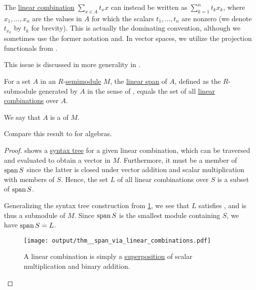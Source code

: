 \begin{remark}\label{rem:linear_combinations}
  The \hyperref[def:free_semimodule]{linear combination} \( \sum_{x \in A} t_x x \) can instead be written as \( \sum_{k=1}^n t_k x_k \), where \( x_1, \ldots, x_n \) are the values in \( A \) for which the scalars \( t_1, \ldots, t_n \) are nonzero (we denote \( t_{x_k} \) by \( t_k \) for brevity). This is actually the dominating convention, although we sometimes use the former notation and. In vector spaces, we utilize the projection functionals from .

  This issue is discussed in more generality in .
\end{remark}

\begin{proposition}\label{thm:span_via_linear_combinations}
  For a set \( A \) in an \( R \)-\hyperref[def:semimodule]{semimodule} \( M \), the \hyperref[def:semimodule/submodel]{linear span} of \( A \), defined as the \( R \)-submodule generated by \( A \) in the sense of , equals the set of all \hyperref[rem:linear_combinations]{linear combinations} over \( A \).

  We say that \( A \) is a  of \( M \).

  Compare this result to  for algebras.
\end{proposition}
\begin{proof}
   shows a \hyperref[def:concrete_syntax_tree]{syntax tree} for a given linear combination, which can be traversed and evaluated to obtain a vector in \( M \). Furthermore, it must be a member of \( \operatorname{span} S \) since the latter is closed under vector addition and scalar multiplication with members of \( S \). Hence, the set \( L \) of all linear combinations over \( S \) is a subset of \( \operatorname{span} S \).

  Generalizing the syntax tree construction from \cref{fig:thm:span_via_linear_combinations}, we see that \( L \) satisfies , and is thus a submodule of \( M \). Since \( \operatorname{span} S \) is the smallest module containing \( S \), we have \( \operatorname{span} S = L \).

  \begin{figure}[!ht]
    \hfill
    \texttt{[image: output/thm\_\_span\_via\_linear\_combinations.pdf]}
    \hfill\hfill
    \caption{A linear combination is simply a \hyperref[def:multi_valued_function/superposition]{superposition} of scalar multiplication and binary addition.}
    \label{fig:thm:span_via_linear_combinations}
  \end{figure}
\end{proof}

